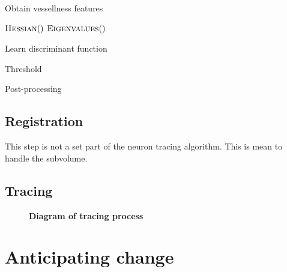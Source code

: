 \begin{algorithm}
	\caption{Obtain vessellness features}\label{alg:seg_vessellness}
	\begin{algorithmic}[1]
		$\Call{Hessian}$
		$\Call{Eigenvalues}$
	\end{algorithmic}
\end{algorithm}

\begin{algorithm}
	\caption{Learn discriminant function}\label{alg:seg_discrim}
	\begin{algorithmic}[1]
	\end{algorithmic}
\end{algorithm}

\begin{algorithm}
	\caption{Threshold}\label{alg:seg_threshold}
	\begin{algorithmic}[1]
	\end{algorithmic}
\end{algorithm}

\begin{algorithm}
	\caption{Post-processing}\label{alg:seg_post}
	\begin{algorithmic}[1]
	\end{algorithmic}
\end{algorithm}

\subsection{Registration}

This step is not a set part of the neuron tracing algorithm. This is mean to handle the subvolume.

\subsection{Tracing}

\begin{figure}
\centering
\resizebox{1.0\textwidth}{!}{}
\caption[Diagram of tracing process]{\textbf{Diagram of tracing process}}\label{fig:proc-tracing}
\end{figure}



\section{Anticipating change}


